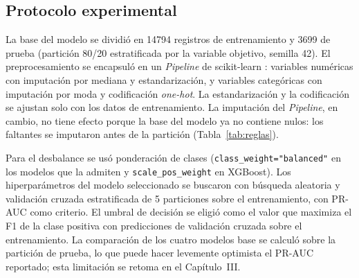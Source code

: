\subsection{Protocolo experimental}
La base del modelo se dividió en \num{14794} registros de entrenamiento y \num{3699} de prueba (partición 80/20 estratificada por la variable objetivo, semilla 42). El preprocesamiento se encapsuló en un \textit{Pipeline} de scikit-learn \cite{pedregosa2011scikit}: variables numéricas con imputación por mediana y estandarización, y variables categóricas con imputación por moda y codificación \textit{one-hot}. La estandarización y la codificación se ajustan solo con los datos de entrenamiento. La imputación del \textit{Pipeline}, en cambio, no tiene efecto porque la base del modelo ya no contiene nulos: los faltantes se imputaron antes de la partición (Tabla~\ref{tab:reglas}).

Para el desbalance se usó ponderación de clases (\texttt{class\_weight="balanced"} en los modelos que la admiten y \texttt{scale\_pos\_weight} en XGBoost). Los hiperparámetros del modelo seleccionado se buscaron con búsqueda aleatoria \cite{bergstra2012random} y validación cruzada estratificada de 5 particiones sobre el entrenamiento, con PR-AUC como criterio. El umbral de decisión se eligió como el valor que maximiza el F1 de la clase positiva con predicciones de validación cruzada sobre el entrenamiento. La comparación de los cuatro modelos base se calculó sobre la partición de prueba, lo que puede hacer levemente optimista el PR-AUC reportado; esta limitación se retoma en el Capítulo~III.



